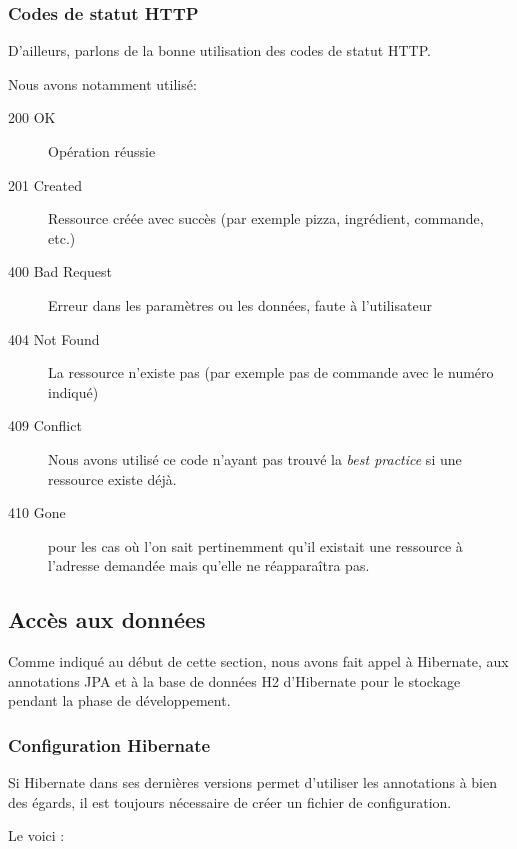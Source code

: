 \subsubsection{Codes de statut HTTP}

D'ailleurs, parlons de la bonne utilisation des codes de statut HTTP.

Nous avons notamment utilisé:

\begin{description}
\item[200 OK] Opération réussie
\item[201 Created] Ressource créée avec succès (par exemple pizza, ingrédient, commande, etc.)
\item[400 Bad Request] Erreur dans les paramètres ou les données, faute à l'utilisateur
\item[404 Not Found] La ressource n'existe pas (par exemple pas de commande avec le numéro indiqué)
\item[409 Conflict] Nous avons utilisé ce code n'ayant pas trouvé la \emph{best practice} si une ressource
                    existe déjà.
\item[410 Gone] pour les cas où l'on sait pertinemment qu'il existait une ressource à l'adresse
                demandée mais qu'elle ne réapparaîtra pas.
\end{description}

\subsection{Accès aux données}

Comme indiqué au début de cette section, nous avons fait appel à Hibernate, aux annotations JPA
et à la base de données H2 d'Hibernate pour le stockage pendant la phase de développement.

\subsubsection{Configuration Hibernate}

Si Hibernate dans ses dernières versions permet d'utiliser les annotations à bien des égards, il
est toujours nécessaire de créer un fichier de configuration.

Le voici :

